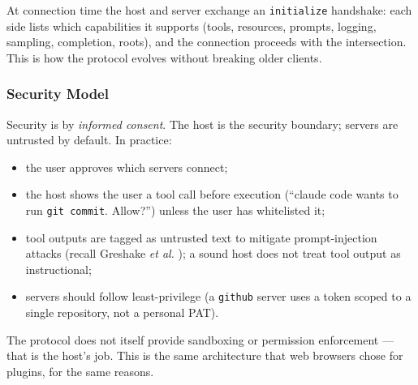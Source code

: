 At connection time the host and server exchange an
\texttt{initialize} handshake: each side lists which capabilities
it supports (tools, resources, prompts, logging, sampling,
completion, roots), and the connection proceeds with the
intersection. This is how the protocol evolves without breaking
older clients.

\subsubsection{Security Model}

Security is by \emph{informed consent}. The host is the security
boundary; servers are untrusted by default. In practice:
\begin{itemize}
  \item the user approves which servers connect;
  \item the host shows the user a tool call before execution
        (``claude code wants to run \texttt{git commit}. Allow?'')
        unless the user has whitelisted it;
  \item tool outputs are tagged as untrusted text to mitigate
        prompt-injection attacks (recall Greshake \emph{et al.}
        \citep{greshake2023injection}); a sound host does not
        treat tool output as instructional;
  \item servers should follow least-privilege (a \texttt{github}
        server uses a token scoped to a single repository, not a
        personal PAT).
\end{itemize}

The protocol does not itself provide sandboxing or permission
enforcement --- that is the host's job. This is the same
architecture that web browsers chose for plugins, for the same
reasons.

